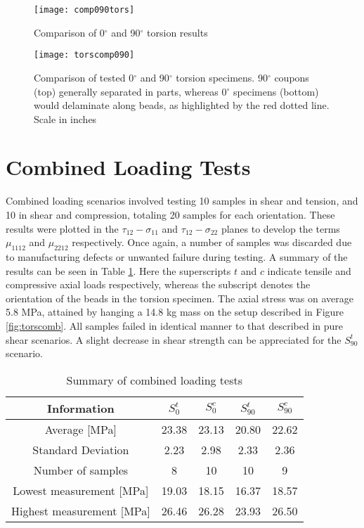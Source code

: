 \documentclass[main.tex]{subfiles}
\begin{document}
\newpage

\begin{figure}[!htbp]
	\center
	\texttt{[image: comp090tors]}
	\caption{Comparison of 0$^\circ$ and 90$^\circ$ torsion results} \label{fig:090comptors}
\end{figure}

\begin{figure}[!htbp]
	\center
	\texttt{[image: torscomp090]}
	\captionsetup{justification=centering} %
	\caption[Comparison of tested 0$^\circ$ and 90$^\circ$ torsion specimens]{Comparison of tested 0$^\circ$ and 90$^\circ$ torsion specimens. 90$^\circ$ coupons (top) generally separated in parts, whereas 0$^\circ$ specimens (bottom) would delaminate along beads, as highlighted by the red dotted line. Scale in inches} \label{fig:090ctors}
\end{figure}
   
\section{Combined Loading Tests} \label{sec:clr}

Combined loading scenarios involved testing 10 samples in shear and tension, and 10 in shear and compression, totaling 20 samples for each orientation. These results were plotted in the $\tau_{12}-\sigma_{11}$ and $\tau_{12}-\sigma_{22}$ planes to develop the terms $\mu_{1112}$ and $\mu_{2212}$ respectively. Once again, a number of samples was discarded due to manufacturing defects or unwanted failure during testing. A summary of the results can be seen in Table \ref{tab:combl}. Here the superscripts $t$ and $c$ indicate tensile and compressive axial loads respectively, whereas the subscript denotes the orientation of the beads in the torsion specimen. The axial stress was on average 5.8 MPa, attained by hanging a 14.8 kg mass on the setup described in Figure \ref{fig:torscomb}. All samples failed in identical manner to that described in pure shear scenarios. A slight decrease in shear strength can be appreciated for the $S_{90}^t$ scenario.
 
\begin{table} [h]
	\centering
	\caption{Summary of combined loading tests}
	\begin{tabular}{ c| c c c c} 
		\toprule
		\textbf{Information} & $S_{0}^t$ &$S_{0}^c$ & $S_{90}^t$& $S_{90}^c$\\
		\midrule
		Average [MPa] &23.38 &23.13 &20.80 &22.62\\
		Standard Deviation &2.23 &2.98 &2.33 &2.36\\
		Number of samples &8 &10 &10 &9\\
		Lowest measurement [MPa] &19.03 &18.15 &16.37 &18.57\\
		Highest measurement [MPa] &26.46 &26.28 &23.93 &26.50\\
		\bottomrule
	\end{tabular}
	\label{tab:combl}
\end{table}
 
\end{document}
